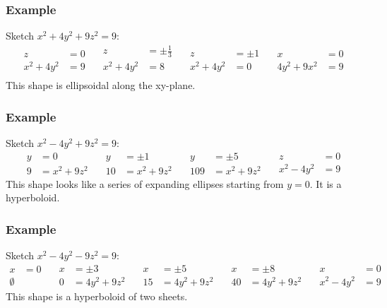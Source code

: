 \documentclass{math}
\begin{document}
\subsubsection*{Example}
Sketch \( x^2+4y^2+9z^2 = 9 \):
\[ \begin{split}
  z &= 0 \\
  x^2+4y^2 &= 9
\end{split}\quad\begin{split}
  z &= \pm\frac{1}{3} \\
  x^2+4y^2 &= 8 \\
\end{split}\quad\begin{split}
  z &= \pm1 \\
  x^2+4y^2 &= 0
\end{split}\quad\begin{split}
  x &= 0 \\
  4y^2+9x^2 &= 9
\end{split} \]
This shape is ellipsoidal along the xy-plane.

\subsubsection*{Example}
Sketch \( x^2-4y^2+9z^2 = 9 \):
\[ \begin{split}
  y &= 0 \\
  9 &= x^2+9z^2
\end{split}\quad\begin{split}
  y &= \pm1 \\
  10 &= x^2+9z^2
\end{split}\quad\begin{split}
  y &= \pm5 \\
  109 &= x^2+9z^2
\end{split}\quad\begin{split}
  z &= 0 \\
  x^2-4y^2 &= 9
\end{split} \]
This shape looks like a series of expanding ellipses starting from \( y = 0 \).
It is a hyperboloid.

\subsubsection*{Example}
Sketch \( x^2-4y^2-9z^2 = 9 \):
\[ \begin{split}
  x &= 0 \\
  \emptyset
\end{split}\quad\begin{split}
  x &= \pm3 \\
  0 &= 4y^2+9z^2
\end{split}\quad\begin{split}
  x &= \pm5 \\
  15 &= 4y^2+9z^2
\end{split}\quad\begin{split}
  x &= \pm8 \\
  40 &= 4y^2+9z^2
\end{split}\quad\begin{split}
  x &= 0 \\
  x^2-4y^2 &= 9
\end{split} \]
This shape is a hyperboloid of two sheets.
\end{document}
